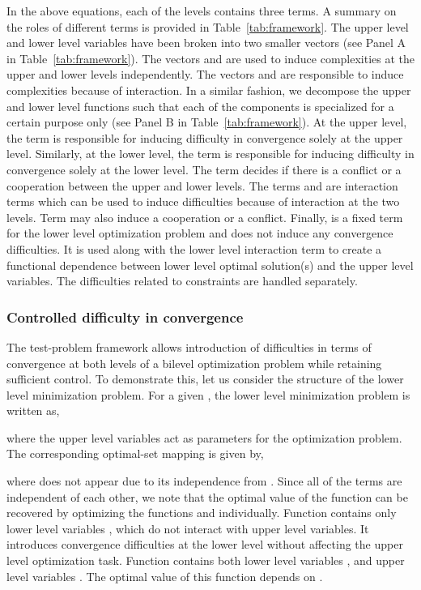 \documentclass[twoside]{article}
\begin{document}
In the above equations, each of the levels contains three terms. A summary on the roles of different terms is provided in Table~\ref{tab:framework}. The upper level and lower level variables have been broken into two smaller vectors (see Panel A in Table~\ref{tab:framework}). The vectors  and  are used to induce complexities at the upper and lower levels independently. The vectors  and  are responsible to induce complexities because of interaction. In a similar fashion, we decompose the upper and lower level functions such that each of the components is specialized for a certain purpose only (see Panel B in Table~\ref{tab:framework}). At the upper level, the term  is responsible for inducing difficulty in convergence solely at the upper level. Similarly, at the lower level, the term  is responsible for inducing difficulty in convergence solely at the lower level. The term  decides if there is a conflict or a cooperation between the upper and lower levels. The terms  and  are interaction terms which can be used to induce difficulties because of interaction at the two levels. Term  may also induce a cooperation or a conflict. Finally,  is a fixed term for the lower level optimization problem and does not induce any convergence difficulties. It is used along with the lower level interaction term to create a functional dependence between lower level optimal solution(s) and the upper level variables. The difficulties related to constraints are handled separately.

\subsubsection{Controlled difficulty in convergence}

The test-problem framework allows introduction of difficulties in terms of convergence at both levels of a bilevel optimization problem while retaining sufficient control. To demonstrate this, let us consider the structure of the lower level minimization problem. 
For a given , the lower level minimization problem is written as,

where the upper level variables  act as parameters for the optimization problem. The corresponding optimal-set mapping is given by,

where  does not appear due to its independence from . Since all of the terms are independent of each other, we note that the optimal value of the function  can be recovered by optimizing the functions  and  individually. Function  contains only lower level variables , which do not interact with upper level variables. It introduces convergence difficulties at the lower level without affecting the upper level optimization task. Function  contains both lower level variables , and upper level variables . The optimal value of this function depends on .
\end{document}
